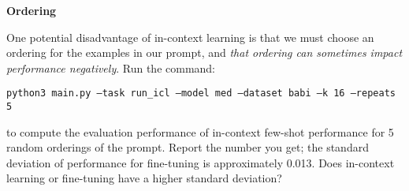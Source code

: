 \item {} {\bf Ordering}

One potential disadvantage of in-context learning is that we must choose an ordering for the examples in our prompt, and \textit{that ordering can sometimes impact performance negatively}. Run the command:

{\small \texttt{python3 main.py --task run\_icl --model med --dataset babi --k 16 --repeats 5}}

to compute the evaluation performance of in-context few-shot performance for 5 random orderings of the prompt. Report the number you get; the standard deviation of performance for fine-tuning is approximately 0.013. Does in-context learning or fine-tuning have a higher standard deviation?